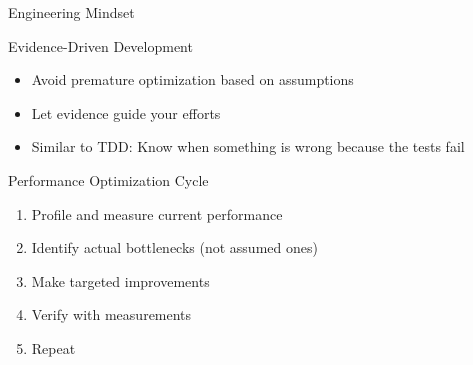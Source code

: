 \documentclass{beamer}
\begin{document}
\begin{frame}{Engineering Mindset}
    \begin{block}{Evidence-Driven Development}
        \begin{itemize}
            \item Avoid premature optimization based on assumptions
            \item Let evidence guide your efforts
            \item Similar to TDD: Know when something is wrong because the tests fail
        \end{itemize}
    \end{block}
    \begin{exampleblock}{Performance Optimization Cycle}
        \begin{enumerate}
            \item Profile and measure current performance
            \item Identify actual bottlenecks (not assumed ones)
            \item Make targeted improvements
            \item Verify with measurements
            \item Repeat
        \end{enumerate}
    \end{exampleblock}
\end{frame}
\end{document}
